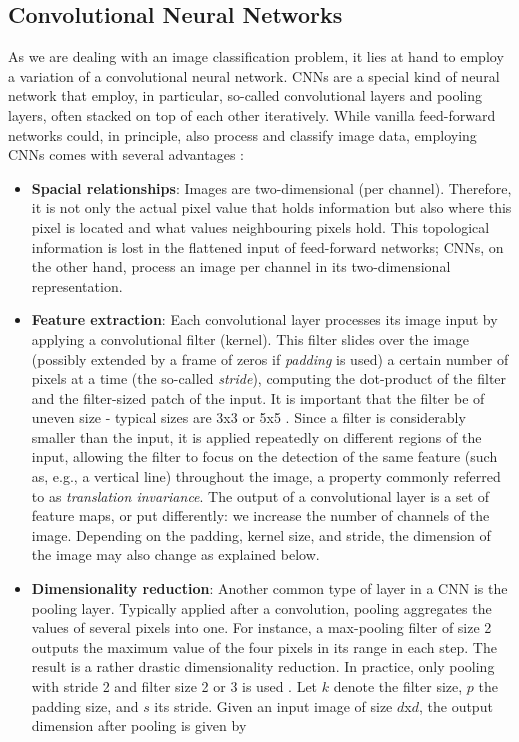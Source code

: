\documentclass[british,12p]{article}
\begin{document}
    \subsection{Convolutional Neural Networks}\label{secCNN}
    As we are dealing with an image classification problem, it lies at hand to employ a variation of a convolutional neural network. CNNs are a special kind of neural network that employ, in particular, so-called convolutional layers and pooling layers, often stacked on top of each other iteratively. While vanilla feed-forward networks could, in principle, also process and classify image data, employing CNNs comes with several advantages \cites{Krizhevsky:2012, shea:15}:
    \begin{itemize}
    	\item \textbf{Spacial relationships}: Images are two-dimensional	(per channel). Therefore, it is not only the actual pixel value that holds information but also where this pixel is located and what values neighbouring pixels hold. This topological information is lost in the flattened input of feed-forward networks; CNNs, on the other hand, process an image per channel in its two-dimensional representation. 
    	\item \textbf{Feature extraction}: Each convolutional layer processes its image input by applying a convolutional filter (kernel). This filter slides over the image (possibly extended by a frame of zeros if \textit{padding} is used) a certain number of pixels at a time (the so-called \textit{stride}), computing the dot-product of the filter and the filter-sized patch of the input. It is important that the filter be of uneven size - typical sizes are 3x3 or 5x5 \cite[p. 97]{buduma:17}. Since a filter is considerably smaller than the input, it is applied repeatedly on different regions of the input, allowing the filter to focus on the detection of the same feature (such as, e.g., a vertical line) throughout the image, a property commonly referred to as \textit{translation invariance}. The output of a convolutional layer is a set of feature maps, or put differently: we increase the number of channels of the image. Depending on the padding, kernel size, and stride, the dimension of the image may also change as explained below.
    	\item \textbf{Dimensionality reduction}: Another common type of layer in a CNN is the pooling layer. Typically applied after a convolution, pooling aggregates the values of several pixels into one. For instance, a max-pooling filter of size 2 outputs the maximum value of the four pixels in its range in each step. The result is a rather drastic dimensionality reduction. In practice, only pooling with stride 2 and filter size 2 or 3 is used \cite[p. 99]{buduma:17}. Let $k$ denote the filter size, $p$ the padding size, and $s$ its stride. Given an input image of size $d$x$d$, the output dimension after pooling is given by

\end{itemize}
\end{document}
